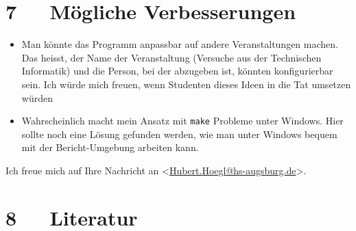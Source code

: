 \documentclass[a4paper,ngerman]{article}
\begin{document}
\section{7~~~Mögliche Verbesserungen%
  \label{mogliche-verbesserungen}%
}
%
\begin{itemize}

\item Man könnte das Programm anpassbar auf andere Veranstaltungen machen. Das
heisst, der Name der Veranstaltung (Versuche aus der Technischen Informatik)
und die Person, bei der abzugeben ist, könnten konfigurierbar sein.
Ich würde mich freuen, wenn Studenten dieses Ideen in die Tat umsetzen würden

\item Wahrscheinlich macht mein Ansatz mit \texttt{make} Probleme unter Windows.
Hier sollte noch eine Lösung gefunden werden, wie man unter Windows
bequem mit der Bericht-Umgebung arbeiten kann.

\end{itemize}

Ich freue mich auf Ihre Nachricht an <\href{mailto:Hubert.Hoegl@hs-augsburg.de}{Hubert.Hoegl@hs-augsburg.de}>.


\section{8~~~Literatur%
  \label{literatur}%
}


\begin{thebibliography}{DOCUTILS}
\end{thebibliography}
\end{document}
